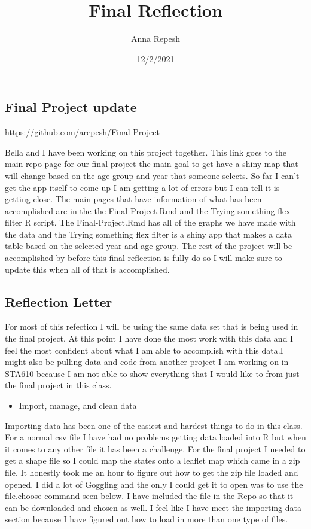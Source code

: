 \documentclass[
]{article}
\title{Final Reflection}
\author{Anna Repesh}
\date{12/2/2021}
\providecommand{\tightlist}{%
  \setlength{\itemsep}{0pt}\setlength{\parskip}{0pt}}
\begin{document}
\maketitle

\hypertarget{final-project-update}{%
\subsection{Final Project update}\label{final-project-update}}

\url{https://github.com/arepesh/Final-Project}

Bella and I have been working on this project together. This link goes
to the main repo page for our final project the main goal to get have a
shiny map that will change based on the age group and year that someone
selects. So far I can't get the app itself to come up I am getting a lot
of errors but I can tell it is getting close. The main pages that have
information of what has been accomplished are in the the
Final-Project.Rmd and the Trying something flex filter R script. The
Final-Project.Rmd has all of the graphs we have made with the data and
the Trying something flex filter is a shiny app that makes a data table
based on the selected year and age group. The rest of the project will
be accomplished by before this final reflection is fully do so I will
make sure to update this when all of that is accomplished.

\hypertarget{reflection-letter}{%
\subsection{Reflection Letter}\label{reflection-letter}}

For most of this refection I will be using the same data set that is
being used in the final project. At this point I have done the most work
with this data and I feel the most confident about what I am able to
accomplish with this data.I might also be pulling data and code from
another project I am working on in STA610 because I am not able to show
everything that I would like to from just the final project in this
class.

\begin{itemize}
\tightlist
\item
  Import, manage, and clean data
\end{itemize}

Importing data has been one of the easiest and hardest things to do in
this class. For a normal csv file I have had no problems getting data
loaded into R but when it comes to any other file it has been a
challenge. For the final project I needed to get a shape file so I could
map the states onto a leaflet map which came in a zip file. It honestly
took me an hour to figure out how to get the zip file loaded and opened.
I did a lot of Goggling and the only I could get it to open was to use
the file.choose command seen below. I have included the file in the Repo
so that it can be downloaded and chosen as well. I feel like I have meet
the importing data section because I have figured out how to load in
more than one type of files.
\end{document}
